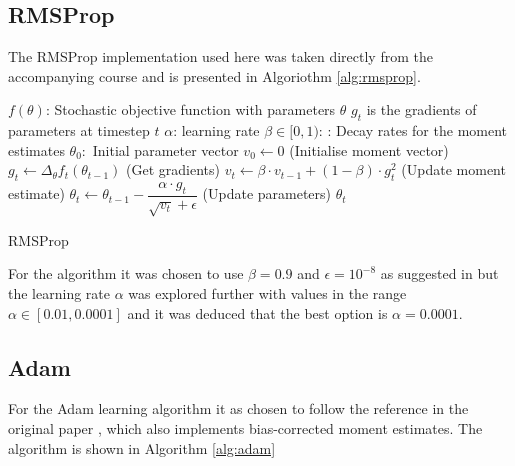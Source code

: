\documentclass{article}
\begin{document}
\subsection{RMSProp}
The RMSProp implementation used here was taken directly from the accompanying course  \citep{RMSProp_lecture} and is presented in Algoriothm \ref{alg:rmsprop}.

\begin{algorithm}[ht]
\begin{algorithmic}
   \STATE $f(\theta)$: Stochastic objective function with parameters $\theta$ 
   \STATE $g_t$ is the gradients of parameters at timestep $t$
   \REQUIRE $\alpha$: learning rate
   \REQUIRE $\beta \in [0,1)$: : Decay rates for the moment estimates
   \REQUIRE $\theta_0:$ Initial parameter vector
   \STATE $v_0 \gets 0$ (Initialise moment vector)
   \STATE $g_t \gets \Delta_\theta f_t(\theta_{t-1})$ (Get gradients)
   \STATE $v_t \gets \beta \cdot v_{t-1} + (1-\beta) \cdot g^2_t$ (Update moment estimate)
   \STATE $\theta_t \gets \theta_{t-1} - \dfrac{\alpha \cdot g_t}{\sqrt{v_t} + \epsilon}$ (Update parameters)
   \ENDWHILE
   \RETURN $\theta_t$
\end{algorithmic}
  \caption{RMSProp}
  \label{alg:rmsprop}
\end{algorithm}

For the algorithm it was chosen to use $\beta = 0.9$ and $\epsilon = 10^{-8}$ as suggested in \citep{RMSProp_lecture} but the learning rate $\alpha$ was explored further with values in the range $\alpha \in [0.01, 0.0001]$ and it was deduced that the best option is $\alpha = 0.0001$.

\subsection{Adam}
For the Adam learning algorithm it as chosen to follow the reference in the original paper \citep{Adam}, which also implements bias-corrected moment estimates. The algorithm is shown in Algorithm \ref{alg:adam}
\end{document}
